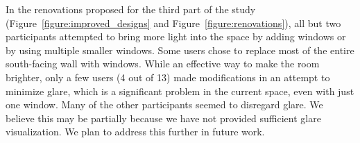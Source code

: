 \documentclass{article}
\begin{document}


In the renovations proposed for the third part of the study
(Figure~\ref{figure:improved_designs} and Figure~\ref{figure:renovations}), all but two participants
attempted to bring more light into the space by adding windows or by
using multiple smaller windows.
%
Some users chose to replace most of the entire
south-facing wall with windows.  While an effective way to make the
room brighter, only a few users (4 out of 13) made modifications in an
attempt to minimize glare,
which is a significant problem in the current space, even with just
one window.  %
Many of the other participants seemed to disregard glare.  We believe
this may be partially because we have not provided sufficient glare
visualization.  We plan to address this further in future work.


\end{document}
